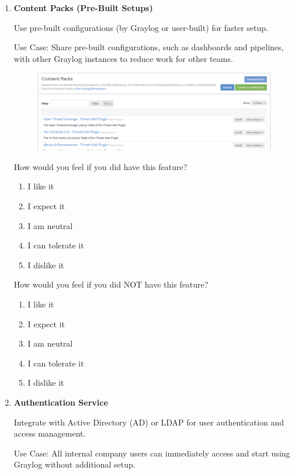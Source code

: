 \documentclass[../main.tex]{subfiles}
\begin{document}
\begin{enumerate}
    \clearpage
    \item \textbf{Content Packs (Pre-Built Setups)}
    
    Use pre-built configurations (by Graylog or user-built) for faster setup. 
    
    Use Case: Share pre-built configurations, such as dashboards and pipelines, with other Graylog instances to reduce work for other teams.

    \begin{figure}[H]
        \centering
        \includegraphics[scale=0.3]{img/10-appendix/content_packs.png}
        \label{fig:content_packs}
    \end{figure}

    How would you feel if you did have this feature?
    \begin{enumerate}
        \item I like it
        \item I expect it
        \item  I am neutral
        \item I can tolerate it
        \item I dislike it
    \end{enumerate}

    How would you feel if you did NOT have this feature?
    \begin{enumerate}
        \item I like it
        \item I expect it
        \item  I am neutral
        \item I can tolerate it
        \item I dislike it
    \end{enumerate}

    \clearpage
    \item \textbf{Authentication Service}
        
    Integrate with Active Directory (AD) or LDAP for user authentication and access management. 
    
    Use Case: All internal company users can immediately access and start using Graylog without additional setup.


\end{enumerate}
\end{document}
